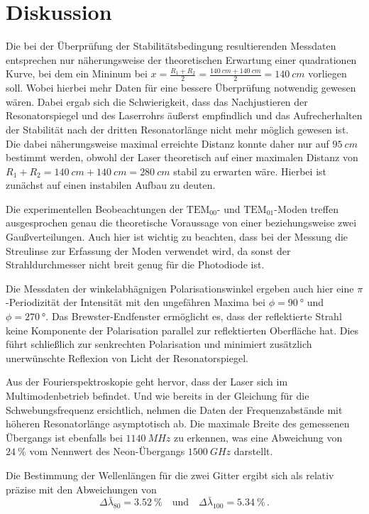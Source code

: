 \section{Diskussion}
\label{sec:Diskussion}

Die bei der Überprüfung der Stabilitätsbedingung resultierenden Messdaten entsprechen nur näherungsweise der theoretischen Erwartung
einer quadrationen Kurve, bei dem ein Mininum bei 
$ x = \frac{R_1 + R_2}{2} = \frac{\qty{140}{cm} + \qty{140}{cm}}{2} = \qty{140}{cm}$ vorliegen soll.
Wobei hierbei mehr Daten für eine bessere Überprüfung notwendig gewesen wären.
Dabei ergab sich die Schwierigkeit, 
dass das Nachjustieren der Resonatorspiegel und des Laserrohrs äußerst empfindlich
und das Aufrecherhalten der Stabilität nach der dritten Resonatorlänge nicht mehr möglich gewesen ist.
Die dabei näherungsweise maximal erreichte Distanz konnte daher nur auf $\qty{95}{cm}$ bestimmt werden, 
obwohl der Laser theoretisch auf einer maximalen Distanz von $R_1 + R_2 =  \qty{140}{cm} + \qty{140}{cm} = \qty{280}{cm}$ stabil zu erwarten wäre. 
Hierbei ist zunächst auf einen instabilen Aufbau zu deuten. 

Die experimentellen Beobeachtungen der $\text{TEM}_{00}$- und $\text{TEM}_{01}$-Moden treffen ausgesprochen genau die
theoretische Voraussage von einer beziehungsweise zwei Gaußverteilungen. 
Auch hier ist wichtig zu beachten, dass bei der Messung die Streulinse zur Erfassung der Moden verwendet wird,
da sonst der Strahldurchmesser nicht breit genug für die Photodiode ist.

Die Messdaten der winkelabhägnigen Polarisationswinkel ergeben auch hier eine $\pi$-Periodizität der Intensität
mit den ungefähren Maxima bei $\phi = \qty{90}{\degree}$ und $\phi = \qty{270}{\degree}$.
Das Brewster-Endfenster ermöglicht es, dass der reflektierte Strahl keine Komponente der Polarisation parallel zur reflektierten Oberfläche hat.
Dies führt schließlich zur senkrechten Polarisation und minimiert zusätzlich unerwünschte Reflexion von Licht der Resonatorspiegel.

Aus der Fourierspektroskopie geht hervor, dass der Laser sich im Multimodenbetrieb befindet.
Und wie bereits in der Gleichung für die Schwebungsfrequenz ersichtlich, 
nehmen die Daten der Frequenzabstände mit höheren Resonatorlänge asymptotisch ab.
Die maximale Breite des gemessenen Übergangs ist ebenfalls bei $\qty{1140}{MHz}$ zu erkennen, 
was eine Abweichung von $\qty{24}{\percent}$ vom Nennwert des Neon-Übergangs $\qty{1500}{GHz}$ darstellt.

Die Bestimmung der Wellenlängen für die zwei Gitter ergibt sich als relativ präzise mit den Abweichungen von
\begin{equation*}
    \Delta \bar{\lambda}_{80} = \qty{3.52}{\percent} \quad \text{und} \quad 
    \Delta \bar{\lambda}_{100} = \qty{5.34}{\percent} \, .
\end{equation*}